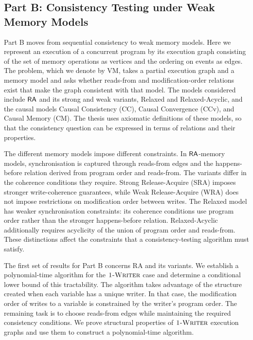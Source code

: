 \subsection{Part B: Consistency Testing under Weak Memory Models}

Part B moves from sequential consistency to weak memory models. Here we represent an execution of a concurrent program by its execution graph consisting of the set of memory operations as vertices and the ordering on events as edges. The problem, which we denote by VM, takes a partial execution graph and a memory model and asks whether reads-from and modification-order relations exist that make the graph consistent with that model. The models considered include $\mathsf{RA}$ and its strong and weak variants, Relaxed and Relaxed-Acyclic, and the causal models Causal Consistency (CC), Causal Convergence (CCv), and Causal Memory (CM). The thesis uses axiomatic definitions of these models, so that the consistency question can be expressed in terms of relations and their properties.

The different memory models impose different constraints. In $\mathsf{RA}$-memory models, synchronisation is captured through reads-from edges and the happens-before relation derived from program order and reads-from. The variants differ in the coherence conditions they require. Strong Release-Acquire (SRA) imposes stronger write-coherence guarantees, while Weak Release-Acquire (WRA) does not impose restrictions on modification order between writes. The Relaxed model has weaker synchronisation constraints: its coherence conditions use program order rather than the stronger happens-before relation. Relaxed-Acyclic additionally requires acyclicity of the union of program order and reads-from. These distinctions affect the constraints that a consistency-testing algorithm must satisfy.

The first set of results for Part B concerns RA and its variants. We establish a polynomial-time algorithm for the $\textsc{1-Writer}$ case and determine a conditional lower bound of this tractability. The algorithm takes advantage of the structure created when each variable has a unique writer. In that case, the modification order of writes to a variable is constrained by the writer's program order. The remaining task is to choose reads-from edges while maintaining the required consistency conditions. We prove structural properties of $\textsc{1-Writer}$ execution graphs and use them to construct a polynomial-time algorithm.

